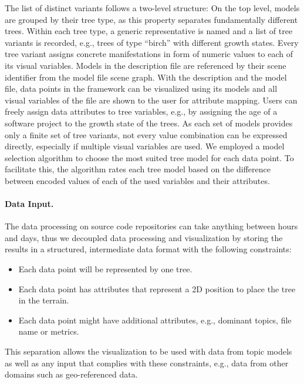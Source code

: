\documentclass[a4paper,twoside]{article}
\begin{document}
The list of distinct variants follows a two-level structure: 
On the top level, models are grouped by their tree type, as this property separates fundamentally different trees. 
Within each tree type, a generic representative is named and a list of tree variants is recorded, e.g., trees of type \enquote{birch} with different growth states. 
Every tree variant assigns concrete manifestations in form of numeric values to each of its visual variables. 
Models in the description file are referenced by their scene identifier from the model file scene graph.
With the description and the model file, data points in the framework can be visualized using its models and all visual variables of the file are shown to the user for attribute mapping.
Users can freely assign data attributes to tree variables, e.g., by assigning the age of a software project to the growth state of the trees.
As each set of models provides only a finite set of tree variants, not every value combination can be expressed directly, especially if multiple visual variables are used. 
We employed a model selection algorithm to choose the most suited tree model for each data point.
To facilitate this, the algorithm rates each tree model based on the difference between encoded values of each of the used variables and their attributes.

\label{subsec:connectionDataViz:CSV}
\paragraph{Data Input.}
The data processing on source code repositories can take anything between hours and days, thus we decoupled data processing and visualization by storing the results in a structured, intermediate data format with the following constraints:
\begin{itemize}
    \item Each data point will be represented by one tree.
    \item Each data point has attributes that represent a 2D position to place the tree in the terrain.
    \item Each data point might have additional attributes, e.g., dominant topics, file name or metrics.
\end{itemize}

\noindent This separation allows the visualization to be used with data from topic models as well as any input that complies with these constraints, e.g., data from other domains such as geo-referenced data.
\end{document}
